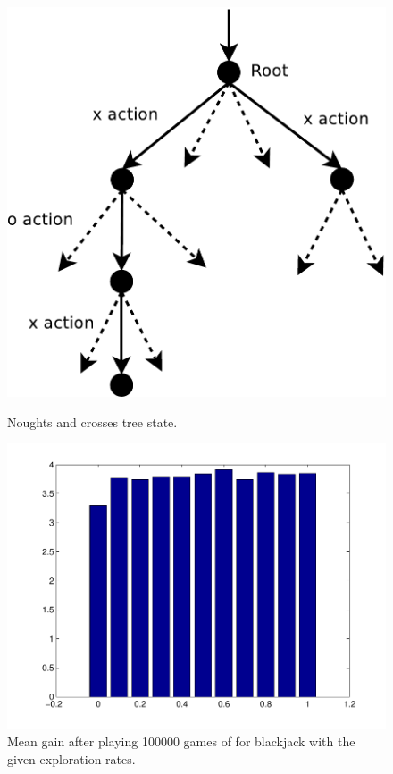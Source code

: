 \documentclass[12pt]{article}
\begin{document}
\begin{figure}[htbp!]
\centering
\begin{minipage}[t]{0.45\linewidth}
	\includegraphics[scale=0.4]{images/ttt_tree}
	\caption{Noughts and crosses tree state.}
	\label{fig:ttt_tree}
\end{minipage}
\quad
\begin{minipage}[t]{0.45\linewidth}
	\includegraphics[scale=0.4]{images/blackjackExpectedGain}
	\caption{Mean gain after playing 100000 games of for blackjack with the given exploration rates.}
	\label{fig:blackjackExpectedGain}
\end{minipage}
\end{figure}
\end{document}
